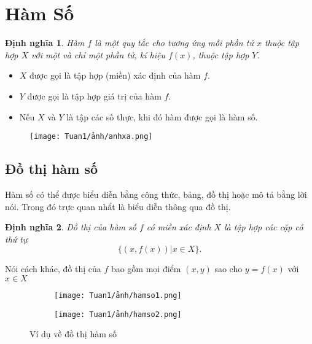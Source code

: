 \newtheorem{definition}{Định nghĩa}[section]    
\newtheorem{theorem}{Định lý}
\newtheorem{corollary}[theorem]{Hệ quả}
\newtheorem{lemma}[theorem]{Bổ đề}

\section{Hàm Số}    
\begin{definition}
Hàm $f$ là một quy tắc cho tương ứng mỗi phần tử $x$ thuộc tập hợp $X$ với một và chỉ một phần tử, kí hiệu $f(x)$, thuộc tập hợp $Y$.
\end{definition}    
\begin{itemize}
    \item $X$ được gọi là tập hợp (miền) xác định của hàm $f$.    
    \item $Y$ được gọi là tập hợp giá trị của hàm $f$. 
    \item Nếu $X$ và $Y$ là tập các số thực, khi đó hàm được gọi là hàm số.
\end{itemize}

\begin{figure}[htbp]
    \centering
    \texttt{[image: Tuan1/ảnh/anhxa.png]}\label{anh1.1}
\end{figure}
\subsection{Đồ thị hàm số}
Hàm số có thể được biểu diễn bằng công thức, bảng, đồ thị hoặc mô tả bằng lời nói. Trong đó trực quan nhẩt là biểu diễn thông qua đồ thị. 
\begin{definition}
    Đồ thị của hàm số $f$ có miền xác định $X$ là tập hợp các cặp có thứ tự  \[ \{\left(x,f(x)\right)\vert x\in X \} .\] 
\end{definition}
Nói cách khác, đồ thị của $f$ bao gồm mọi điểm $(x,y)$ sao cho $y=f(x)$ với $x\in X$
\begin{figure}[htbp]
    \centering
    \begin{subfigure}{0.4\textwidth}
        \centering
        \texttt{[image: Tuan1/ảnh/hamso1.png]}
        \caption{}
    \end{subfigure}
    \hfill
    \begin{subfigure}{0.4\textwidth}
        \centering
        \texttt{[image: Tuan1/ảnh/hamso2.png]}
        \caption{}
    \end{subfigure}
    \caption{Ví dụ về đồ thị hàm số}\label{anh1.2}
    \end{figure}

